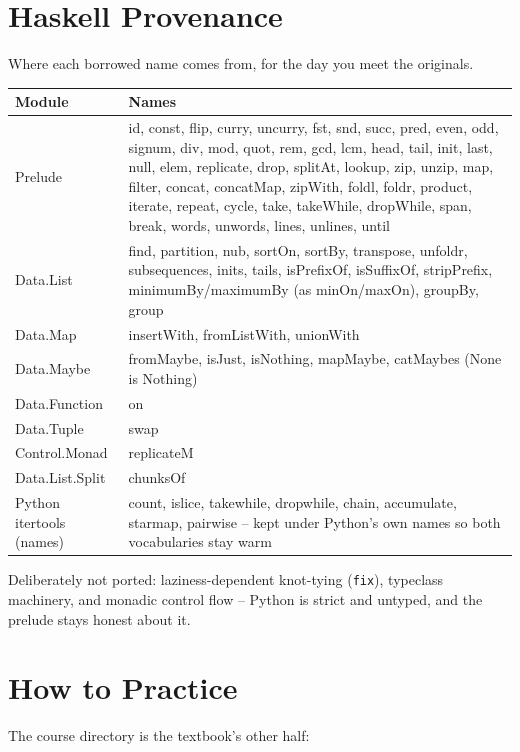 \documentclass[11pt,letterpaper]{book}
\begin{document}
\chapter{Haskell Provenance}
Where each borrowed name comes from, for the day you meet the originals.

\begin{center}\small
\begin{tabular}{@{}p{}p{}@{}}
\toprule
\textbf{Module} & \textbf{Names} \\
\midrule
Prelude &
id, const, flip, curry, uncurry, fst, snd, succ, pred, even, odd, signum,
div, mod, quot, rem, gcd, lcm, head, tail, init, last, null, elem,
replicate, drop, splitAt, lookup, zip, unzip, map, filter,
concat, concatMap, zipWith, foldl, foldr, product, iterate, repeat,
cycle, take, takeWhile, dropWhile, span, break, words, unwords, lines,
unlines, until \\
Data.List &
find, partition, nub, sortOn, sortBy, transpose, unfoldr, subsequences,
inits, tails, isPrefixOf, isSuffixOf, stripPrefix, minimumBy/maximumBy
(as minOn/maxOn), groupBy, group \\
Data.Map &
insertWith, fromListWith, unionWith \\
Data.Maybe &
fromMaybe, isJust, isNothing, mapMaybe, catMaybes (None is Nothing) \\
Data.Function & on \\
Data.Tuple & swap \\
Control.Monad & replicateM \\
Data.List.Split & chunksOf \\
Python itertools (names) &
count, islice, takewhile, dropwhile, chain, accumulate, starmap, pairwise --
kept under Python's own names so both vocabularies stay warm \\
\bottomrule
\end{tabular}
\end{center}

Deliberately not ported: laziness-dependent knot-tying (\texttt{fix}),
typeclass machinery, and monadic control flow -- Python is strict and
untyped, and the prelude stays honest about it.
\chapter{How to Practice}
The course directory is the textbook's other half:
\end{document}
